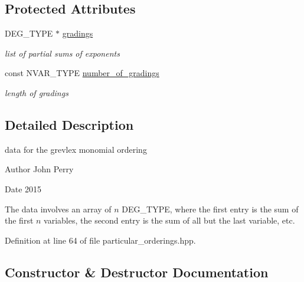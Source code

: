 \subsection*{Protected Attributes}
\begin{DoxyCompactItemize}
\item 
\mbox{\label{class_grevlex___order___data_a0a4ccd9abf8d598bdb64b015f127bf4e}} 
D\+E\+G\+\_\+\+T\+Y\+PE $\ast$ \hyperlink{class_grevlex___order___data_a0a4ccd9abf8d598bdb64b015f127bf4e}{gradings}
\begin{DoxyCompactList}\small\item\em list of partial sums of exponents \end{DoxyCompactList}\item 
\mbox{\label{class_grevlex___order___data_afaddc36a549cd365d5f10bd817ddbef5}} 
const N\+V\+A\+R\+\_\+\+T\+Y\+PE \hyperlink{class_grevlex___order___data_afaddc36a549cd365d5f10bd817ddbef5}{number\+\_\+of\+\_\+gradings}
\begin{DoxyCompactList}\small\item\em length of {\ttfamily gradings} \end{DoxyCompactList}\end{DoxyCompactItemize}


\subsection{Detailed Description}
data for the grevlex monomial ordering 

\begin{DoxyAuthor}{Author}
John Perry 
\end{DoxyAuthor}
\begin{DoxyDate}{Date}
2015
\end{DoxyDate}
The data involves an array of $n$ {\ttfamily D\+E\+G\+\_\+\+T\+Y\+PE}, where the first entry is the sum of the first $n$ variables, the second entry is the sum of all but the last variable, etc. 

Definition at line 64 of file particular\+\_\+orderings.\+hpp.



\subsection{Constructor \& Destructor Documentation}
\mbox{\label{class_grevlex___order___data_a61000659db1597c1fb7f149deb0d952c}} 
